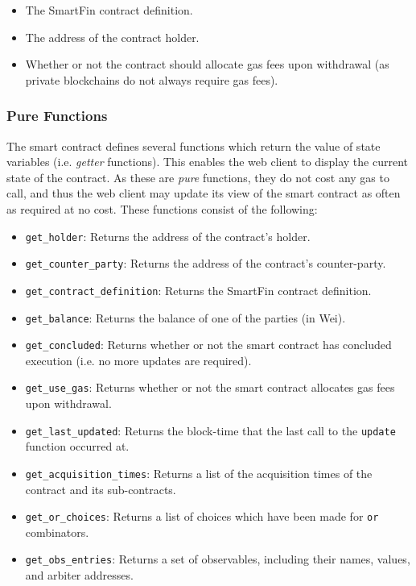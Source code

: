 \begin{itemize}
    \item The SmartFin contract definition.
    \item The address of the contract holder.
    \item Whether or not the contract should allocate gas fees upon withdrawal (as private blockchains do not always require gas fees).
\end{itemize}


\subsubsection{Pure Functions}

The smart contract defines several functions which return the value of state variables (i.e. \textit{getter} functions). This enables the web client to display the current state of the contract. As these are \textit{pure} functions, they do not cost any gas to call, and thus the web client may update its view of the smart contract as often as required at no cost. These functions consist of the following: \\

\begin{itemize}
    \item \texttt{get\_holder}: Returns the address of the contract's holder.
    \item \texttt{get\_counter\_party}: Returns the address of the contract's counter-party.
    \item \texttt{get\_contract\_definition}: Returns the SmartFin contract definition.
    \item \texttt{get\_balance}: Returns the balance of one of the parties (in Wei).
    \item \texttt{get\_concluded}: Returns whether or not the smart contract has concluded execution (i.e. no more updates are required).
    \item \texttt{get\_use\_gas}: Returns whether or not the smart contract allocates gas fees upon withdrawal.
    \item \texttt{get\_last\_updated}: Returns the block-time that the last call to the \texttt{update} function occurred at.
    \item \texttt{get\_acquisition\_times}: Returns a list of the acquisition times of the contract and its sub-contracts.
    \item \texttt{get\_or\_choices}: Returns a list of choices which have been made for \texttt{or} combinators.
    \item \texttt{get\_obs\_entries}: Returns a set of observables, including their names, values, and arbiter addresses.
\end{itemize}

